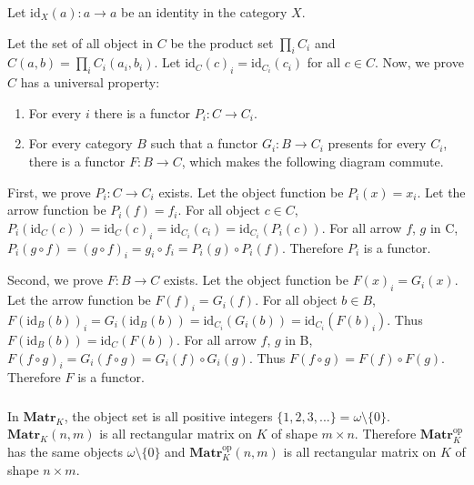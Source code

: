 \documentclass[luatex]{article}
\begin{document}
\showArt

Let $\mathrm{id}_X(a) : a \rightarrow a$ be an identity in the category $X$.

Let the set of all object in $C$ be the product set $\prod_i C_i$ and $C(a, b) = \prod_i C_i(a_i, b_i)$. Let $\mathrm{id}_C(c)_i = \mathrm{id}_{C_i}(c_i)$ for all $c \in C$. Now, we prove $C$ has a universal property:

\begin{enumerate}
\item For every $i$ there is a functor $P_i : C \rightarrow C_i$.
\item For every category $B$ such that a functor $G_i : B \rightarrow C_i$ presents for every $C_i$, there is a functor $F : B \rightarrow C$, which makes the following diagram commute.

\begin{center}
\end{center}
\end{enumerate}

First, we prove $P_i : C \rightarrow C_i$ exists. Let the object function be $P_i(x) = x_i$. Let the arrow function be $P_i(f) = f_i$. For all object $c \in C$, $P_i(\mathrm{id}_C(c)) = \mathrm{id}_C(c)_i = \mathrm{id}_{C_i}(c_i) = \mathrm{id}_{C_i}(P_i(c))$. For all arrow $f$, $g$ in C, $P_i(g \circ f) = (g \circ f)_i = g_i \circ f_i =  P_i(g) \circ P_i(f)$. Therefore $P_i$ is a functor.

Second, we prove $F : B \rightarrow C$ exists. Let the object function be $F(x)_i = G_i(x)$. Let the arrow function be $F(f)_i = G_i(f)$. For all object $b \in B$, $F(\mathrm{id}_B(b))_i = G_i(\mathrm{id}_B(b)) =  \mathrm{id}_{C_i}(G_i(b)) = \mathrm{id}_{C_i}(F(b)_i)$. Thus $F(\mathrm{id}_B(b)) = \mathrm{id}_{C}(F(b))$. For all arrow $f$, $g$ in B, $F(f \circ g)_i = G_i(f \circ g) = G_i(f) \circ G_i(g)$. Thus $F(f \circ g) = F(f) \circ F(g)$. Therefore $F$ is a functor.

\subsubsection{}



\showArt

In $\mathbf{Matr}_K$, the object set is all positive integers $\{1, 2, 3, ...\} = \omega \setminus \{0\}$. $\mathbf{Matr}_K(n, m)$ is all rectangular matrix on $K$ of shape $m \times n$. Therefore $\mathbf{Matr}_K^{\mathrm{op}}$ has the same objects $\omega \setminus \{0\}$ and  $\mathbf{Matr}_K^{\mathrm{op}}(n, m)$ is all rectangular matrix on $K$ of shape $n \times m$.
\end{document}
